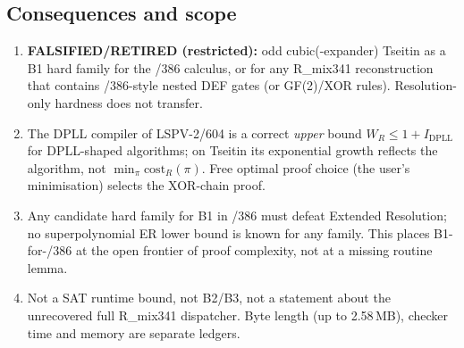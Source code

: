 \documentclass[11pt]{article}
\begin{document}
\subsection*{Consequences and scope}
\begin{enumerate}
\item \textbf{FALSIFIED/RETIRED (restricted):} odd cubic(-expander) Tseitin as a B1 hard family for
the /386 calculus, or for any R\_mix341 reconstruction that contains /386-style nested DEF gates
(or GF(2)/XOR rules). Resolution-only hardness does not transfer.
\item The DPLL compiler of LSPV-2/604 is a correct \emph{upper} bound $W_R\le 1+I_{\mathrm{DPLL}}$
for DPLL-shaped algorithms; on Tseitin its exponential growth reflects the algorithm, not
$\min_\pi\mathrm{cost}_R(\pi)$. Free optimal proof choice (the user's minimisation) selects the
XOR-chain proof.
\item Any candidate hard family for B1 in /386 must defeat Extended Resolution; no superpolynomial
ER lower bound is known for any family. This places B1-for-/386 at the open frontier of proof
complexity, not at a missing routine lemma.
\item Not a SAT runtime bound, not B2/B3, not a statement about the unrecovered full R\_mix341
dispatcher. Byte length (up to 2.58\,MB), checker time and memory are separate ledgers.
\end{enumerate}
\end{document}
